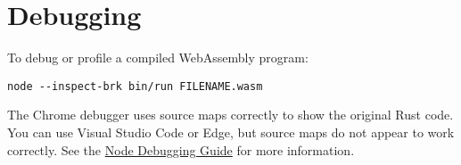 \documentclass{article}
\begin{document}
\section{Debugging}

To debug or profile a compiled WebAssembly program:

\begin{verbatim}
node --inspect-brk bin/run FILENAME.wasm
\end{verbatim}

The Chrome debugger uses source maps correctly to show the original Rust code.
You can use Visual Studio Code or Edge, but source maps do not appear to work
correctly. See the
\href{https://nodejs.org/en/docs/guides/debugging-getting-started/}{Node
Debugging Guide} for more information.
\end{document}

